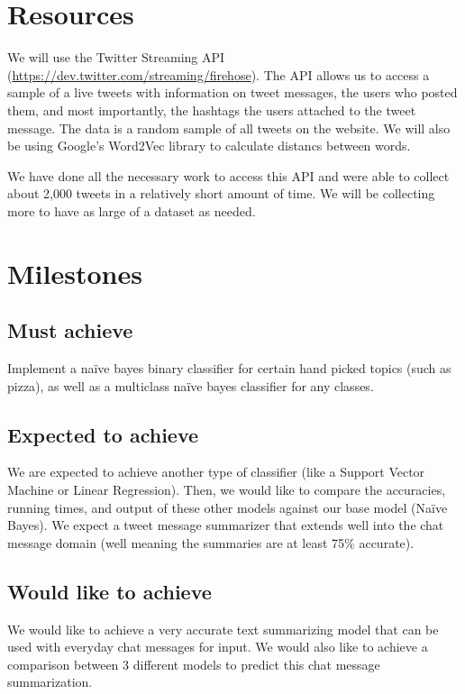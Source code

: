 \documentclass[11pt]{article}
\begin{document}
\section{Resources}
We will use the Twitter Streaming API (\url{https://dev.twitter.com/streaming/firehose}). The API allows us to access a sample of a live tweets with information on tweet messages, the users who posted them, and most importantly, the hashtags the users attached to the tweet message. The data is a random sample of all tweets on the website. We will also be using Google's Word2Vec library to calculate distancs between words.

We have done all the necessary work to access this API and were able to collect about 2,000 tweets in a relatively short amount of time. We will be collecting more to have as large of a dataset as needed.

\section{Milestones}
\subsection{Must achieve}
Implement a na{\"i}ve bayes binary classifier for certain hand picked topics (such as pizza), as well as a multiclass na{\"i}ve bayes classifier for any classes.

\subsection{Expected to achieve}
We are expected to achieve another type of classifier (like a Support Vector Machine or Linear Regression). Then, we would like to compare the accuracies, running times, and output of these other models against our base model (Na{\"i}ve Bayes). We expect a tweet message summarizer that extends well into the chat message domain (well meaning the summaries are at least 75\% accurate).

\subsection{Would like to achieve}
We would like to achieve a very accurate text summarizing model that can be used with everyday chat messages for input. We would also like to achieve a comparison between 3 different models to predict this chat message summarization.
\end{document}
